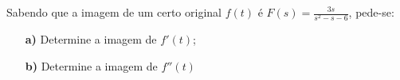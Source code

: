 \linespread{1.5}

Sabendo que a imagem de um certo original $f(t)$ é $F(s) = \frac{3s}{s^2-s-6}$, pede-se:
\begin{itemize}
    \item[\textbf{a)}] Determine a imagem de $f'(t)$;
    \item[\textbf{b)}] Determine a imagem de $f''(t)$
\end{itemize}